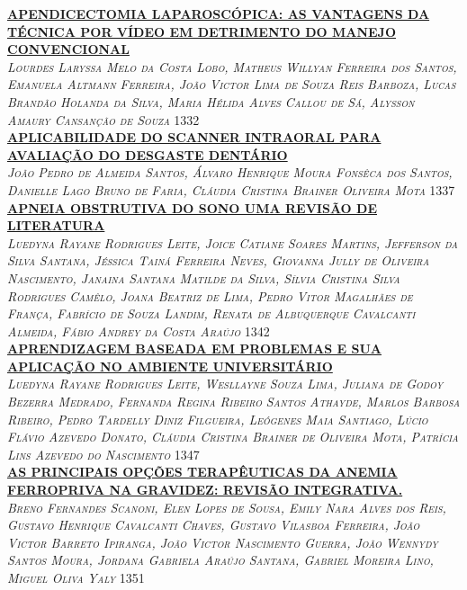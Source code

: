 \noindent \textsc{\hyperlink{trabalhos/251642.pdf.1}{\textbf{APENDICECTOMIA LAPAROSCÓPICA: AS VANTAGENS DA TÉCNICA POR VÍDEO EM DETRIMENTO DO MANEJO CONVENCIONAL}}}\\ 
\noindent \textsc{\textit{Lourdes Laryssa Melo da Costa Lobo, Matheus Willyan Ferreira dos Santos, Emanuela Altmann Ferreira, João Victor Lima de Souza Reis Barboza, Lucas Brandão Holanda da Silva, Maria Hélida Alves Callou de Sá, Alysson Amaury Cansanção de Souza}} \hfill 1332\\ 

\noindent \textsc{\hyperlink{trabalhos/251277.pdf.1}{\textbf{APLICABILIDADE DO SCANNER INTRAORAL PARA AVALIAÇÃO DO DESGASTE DENTÁRIO}}}\\ 
\noindent \textsc{\textit{João Pedro de Almeida Santos, Álvaro Henrique Moura Fonsêca dos Santos, Danielle Lago Bruno de Faria, Cláudia Cristina Brainer Oliveira Mota}} \hfill 1337\\ 

\noindent \textsc{\hyperlink{trabalhos/249664.pdf.1}{\textbf{APNEIA OBSTRUTIVA DO SONO UMA REVISÃO DE LITERATURA }}}\\ 
\noindent \textsc{\textit{Luedyna Rayane Rodrigues Leite, Joice Catiane Soares Martins, Jefferson da Silva Santana, Jéssica Tainá Ferreira Neves, Giovanna Jully de Oliveira Nascimento, Janaina Santana Matilde da Silva, Sílvia Cristina Silva Rodrigues Camêlo, Joana Beatriz de Lima, Pedro Vitor Magalhães de França, Fabrício de Souza Landim, Renata de Albuquerque Cavalcanti Almeida, Fábio Andrey da Costa Araújo}} \hfill 1342\\ 

\noindent \textsc{\hyperlink{trabalhos/251316.pdf.1}{\textbf{APRENDIZAGEM BASEADA EM PROBLEMAS E SUA APLICAÇÃO NO AMBIENTE UNIVERSITÁRIO}}}\\ 
\noindent \textsc{\textit{Luedyna Rayane Rodrigues Leite, Wesllayne Souza Lima, Juliana de Godoy Bezerra Medrado, Fernanda Regina Ribeiro Santos Athayde, Marlos Barbosa Ribeiro, Pedro Tardelly Diniz Filgueira, Leógenes Maia Santiago, Lúcio Flávio Azevedo Donato, Cláudia Cristina Brainer de Oliveira Mota, Patrícia Lins  Azevedo do Nascimento}} \hfill 1347\\ 

\noindent \textsc{\hyperlink{trabalhos/251679.pdf.1}{\textbf{AS PRINCIPAIS OPÇÕES TERAPÊUTICAS DA ANEMIA FERROPRIVA NA GRAVIDEZ: REVISÃO INTEGRATIVA.}}}\\ 
\noindent \textsc{\textit{Breno Fernandes Scanoni, Elen Lopes de Sousa, Emily Nara Alves dos Reis, Gustavo Henrique Cavalcanti Chaves, Gustavo Vilasboa Ferreira, João Victor Barreto Ipiranga, João Victor Nascimento Guerra, João Wennydy Santos Moura, Jordana Gabriela Araújo Santana, Gabriel Moreira Lino, Miguel Oliva Yaly}} \hfill 1351\\ 

